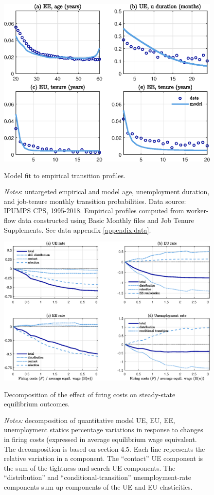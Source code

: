 \documentclass[12pt]{article} %
\theoremstyle{plain}
\theoremstyle{definition}
\begin{document}
	\begin{figure}[!h]
		\centering
		\includegraphics[width = 4.5in]{Figure_4.eps} 
		\caption{Model fit to  empirical transition profiles.}
			\caption*{\footnotesize \textit{Notes}: untargeted empirical and model age, unemployment duration, and job-tenure monthly transition probabilities. Data source: IPUMPS CPS, 1995-2018.  Empirical profiles computed from worker-flow data constructed using Basic Monthly files and Job Tenure Supplements. See data appendix \ref{appendix:data}.}
		\label{fig:fig_5}
	\end{figure}

	\newpage
	
	\begin{figure}[!h]
		\centering
		\includegraphics[width = 6.5in]{Figure_5.eps} 
		\caption{Decomposition of the effect of firing costs on steady-state equilibrium outcomes.}
		\label{fig:fig_6}
		\caption*{\footnotesize{\textit{Notes:} decomposition of quantitative model UE, EU, EE, unemployment statics percentage variations in response to changes in firing costs (expressed in average equilibrium wage equivalent. The decomposition is based on section 4.5. Each line represents the relative variation in a component. The ``contact'' UE component is the sum of the tightness and search UE components. The ``distribution'' and ``conditional-transition'' unemployment-rate components sum up components of the UE and EU elasticities.}}
	\end{figure}
	
\end{document}

